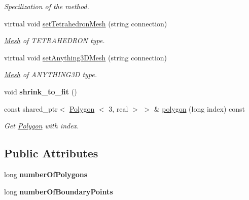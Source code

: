 \begin{DoxyCompactItemize}
\begin{DoxyCompactList}\small\item\em \-Specilization of the method. \end{DoxyCompactList}\item 
virtual void \hyperlink{class_mesh3_d_ad2ce515add93ae41902537fba24a09a2}{set\-Tetrahedron\-Mesh} (string connection)
\begin{DoxyCompactList}\small\item\em \hyperlink{class_mesh}{\-Mesh} of \-T\-E\-T\-R\-A\-H\-E\-D\-R\-O\-N type. \end{DoxyCompactList}\item 
virtual void \hyperlink{class_mesh3_d_a449dba8699a5e4e1ab101a79e411f443}{set\-Anything3\-D\-Mesh} (string connection)
\begin{DoxyCompactList}\small\item\em \hyperlink{class_mesh}{\-Mesh} of \-A\-N\-Y\-T\-H\-I\-N\-G3\-D type. \end{DoxyCompactList}\item 
\hypertarget{class_mesh3_d_a9cdf6867d5a6c53ab50d793360b00132}{void {\bfseries shrink\-\_\-to\-\_\-fit} ()}\label{class_mesh3_d_a9cdf6867d5a6c53ab50d793360b00132}

\item 
\hypertarget{class_mesh3_d_ac43faf1c99509f0aba384eda248202f9}{const shared\-\_\-ptr$<$ \hyperlink{class_polygon}{\-Polygon}\*
$<$ 3, real $>$ $>$ \& \hyperlink{class_mesh3_d_ac43faf1c99509f0aba384eda248202f9}{polygon} (long index) const }\label{class_mesh3_d_ac43faf1c99509f0aba384eda248202f9}

\begin{DoxyCompactList}\small\item\em \-Get \hyperlink{class_polygon}{\-Polygon} with index. \end{DoxyCompactList}\end{DoxyCompactItemize}
\subsection*{\-Public \-Attributes}
\begin{DoxyCompactItemize}
\item 
\hypertarget{class_mesh3_d_a4d5bd1d28908b333881fa0d9f8f50a9b}{long {\bfseries number\-Of\-Polygons}}\label{class_mesh3_d_a4d5bd1d28908b333881fa0d9f8f50a9b}

\item 
\hypertarget{class_mesh3_d_a9a047727135fd08147e4eeadc1f20f96}{long {\bfseries number\-Of\-Boundary\-Points}}\label{class_mesh3_d_a9a047727135fd08147e4eeadc1f20f96}

\end{DoxyCompactItemize}
